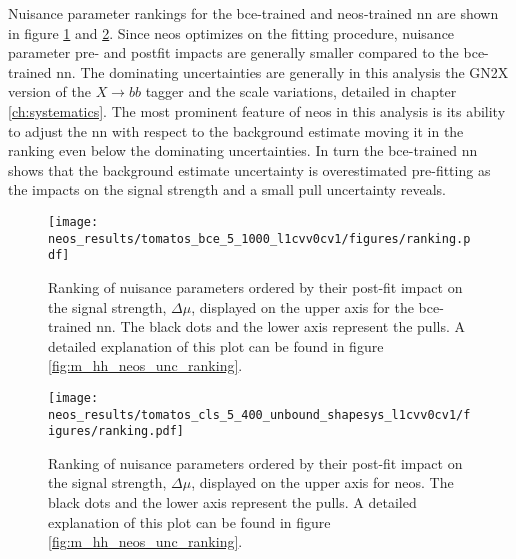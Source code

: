 Nuisance parameter rankings for the \ac{bce}-trained and neos-trained \ac{nn} are shown in figure \ref{fig:neos_valid_ranking_bce} and \ref{fig:neos_valid_ranking_cls}. Since \ac{neos} optimizes on the fitting procedure, nuisance parameter pre- and postfit impacts are generally smaller compared to the \ac{bce}-trained \ac{nn}. The dominating uncertainties are generally in this analysis the GN2X version of the $X\rightarrow bb$ tagger and the scale variations, detailed in chapter \ref{ch:systematics}. The most prominent feature of \ac{neos} in this analysis is its ability to adjust the \ac{nn} with respect to the background estimate moving it in the ranking even below the dominating uncertainties. In turn the \ac{bce}-trained \ac{nn} shows that the background estimate uncertainty is overestimated pre-fitting as the impacts on the signal strength and a small pull uncertainty reveals.

\begin{figure}
    \centering
    \texttt{[image: neos\_results/tomatos\_bce\_5\_1000\_l1cvv0cv1/figures/ranking.pdf]}
    \caption[]{Ranking of nuisance parameters ordered by their post-fit impact on the signal strength, $\Delta\mu$, displayed on the upper axis for the \ac{bce}-trained \ac{nn}. The black dots and the lower axis represent the pulls. A detailed explanation of this plot can be found in figure \ref{fig:m_hh_neos_unc_ranking}.}
    \label{fig:neos_valid_ranking_bce}
\end{figure}
\begin{figure}
    \centering
    \texttt{[image: neos\_results/tomatos\_cls\_5\_400\_unbound\_shapesys\_l1cvv0cv1/figures/ranking.pdf]}
    \caption[]{Ranking of nuisance parameters ordered by their post-fit impact on the signal strength, $\Delta\mu$, displayed on the upper axis for \ac{neos}. The black dots and the lower axis represent the pulls. A detailed explanation of this plot can be found in figure \ref{fig:m_hh_neos_unc_ranking}.}
    \label{fig:neos_valid_ranking_cls}
\end{figure}


